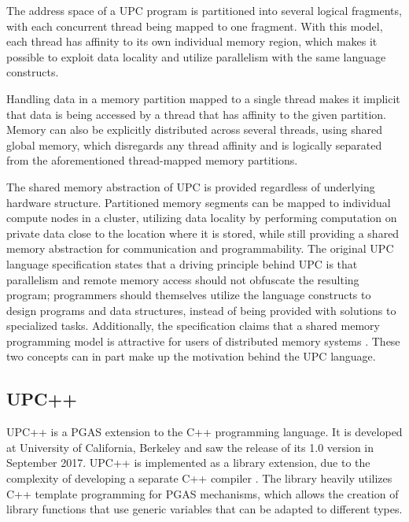 \documentclass{uit-report}
\begin{document}
The address space of a UPC program is partitioned into several logical fragments, with each concurrent thread being mapped to one fragment. With this model, each thread has affinity to its own individual memory region, which makes it possible to exploit data locality \cite{evaluation_of_upc} and utilize parallelism with the same language constructs.

Handling data in a memory partition mapped to a single thread makes it implicit that data is being accessed by a thread that has affinity to the given partition. Memory can also be explicitly distributed across several threads, using shared global memory, which disregards any thread affinity and is logically separated from the aforementioned thread-mapped memory partitions.

The shared memory abstraction of UPC is provided regardless of underlying hardware structure. Partitioned memory segments can be mapped to individual compute nodes in a cluster, utilizing data locality by performing computation on private data close to the location where it is stored, while still providing a shared memory abstraction for communication and programmability. The original UPC language specification states that a driving principle behind UPC is that parallelism and remote memory access should not obfuscate the resulting program; programmers should themselves utilize the language constructs to design programs and data structures, instead of being provided with solutions to specialized tasks. Additionally, the specification claims that a shared memory programming model is attractive for users of distributed memory systems \cite{upc_language_specification}. These two concepts can in part make up the motivation behind the UPC language.



\subsection{UPC++}
UPC++ is a PGAS extension to the C++ programming language. It is developed at University of California, Berkeley and saw the release of its 1.0 version in September 2017. UPC++ is implemented as a library extension, due to the complexity of developing a separate C++ compiler \cite{zheng_kamil_driscoll_shan_yelick_2014}. The library heavily utilizes C++ template programming \cite{web_cpp_template} for PGAS mechanisms, which allows the creation of library functions that use generic variables that can be adapted to different types. 
\end{document}
